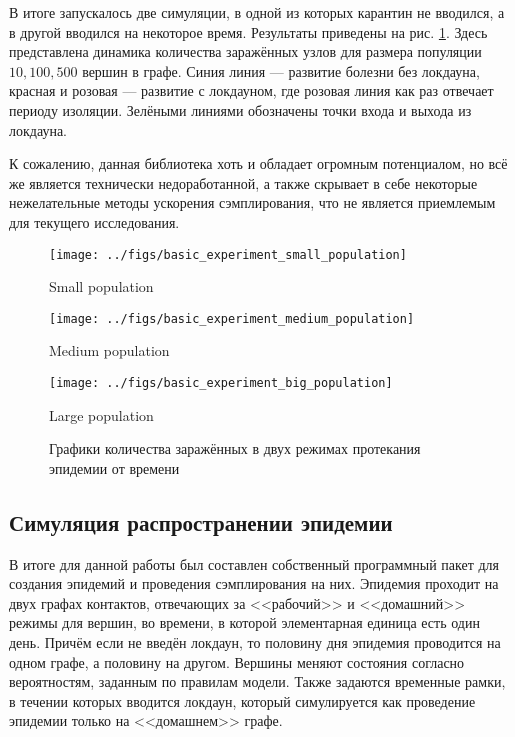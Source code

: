 	В итоге запускалось две симуляции, в одной из которых карантин не вводился, а в другой вводился на некоторое время. Результаты приведены на рис. \ref{pic:basic}. Здесь представлена динамика количества заражённых узлов для размера популяции $ 10, 100, 500 $ вершин в графе. Синия линия --- развитие болезни без локдауна, красная и розовая --- развитие с локдауном, где розовая линия как раз отвечает периоду изоляции. Зелёными линиями обозначены точки входа и выхода из локдауна.
	
	К сожалению, данная библиотека хоть и обладает огромным потенциалом, но всё же является технически недоработанной, а также скрывает в себе некоторые нежелательные методы ускорения сэмплирования, что не является приемлемым для текущего исследования. 
	
	\begin{figure}[h]
		\begin{minipage}{0.49\linewidth}
			\texttt{[image: ../figs/basic\_experiment\_small\_population]}
			
			\centering
			Small population
		\end{minipage}
		\begin{minipage}{0.49\linewidth}
			\texttt{[image: ../figs/basic\_experiment\_medium\_population]}
			
			\centering
			Medium population
		\end{minipage}
		\begin{center}
			\begin{minipage}{0.5\linewidth}
			\texttt{[image: ../figs/basic\_experiment\_big\_population]}
			
			\centering
			Large population
		\end{minipage}
		\end{center}
		\caption{Графики количества заражённых в двух режимах протекания эпидемии от времени}\label{pic:basic}
	\end{figure}

	\subsection*{Симуляция распространении эпидемии}
	
	В итоге для данной работы был составлен собственный программный пакет для создания эпидемий и проведения сэмплирования на них. Эпидемия проходит на двух графах контактов, отвечающих за <<рабочий>> и <<домашний>> режимы для вершин, во времени, в которой элементарная единица есть один день. Причём если не введён локдаун, то половину дня эпидемия проводится на одном графе, а половину на другом. Вершины меняют состояния согласно вероятностям, заданным по правилам модели. Также задаются временные рамки, в течении которых вводится локдаун, который симулируется как проведение эпидемии только на <<домашнем>> графе.
	

